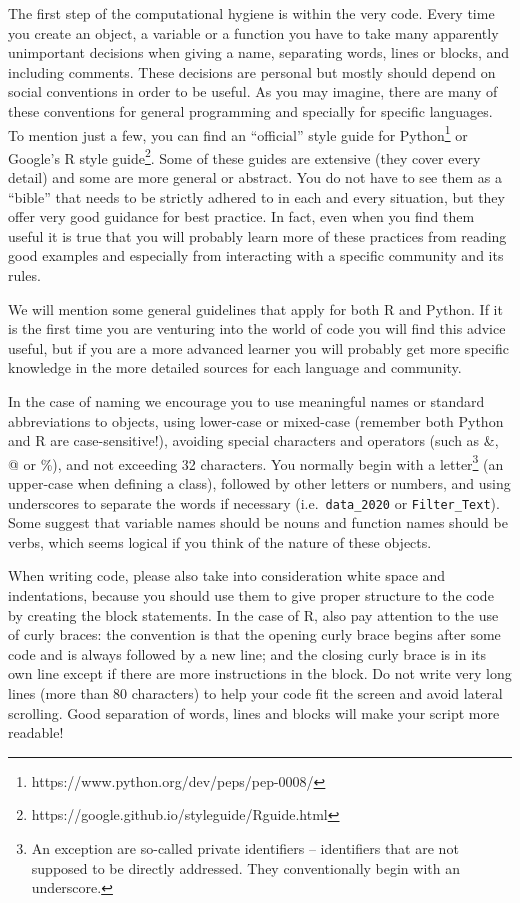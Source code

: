 The first step of the computational hygiene is within the very code. Every time you create an object, a variable or a function you have to take many apparently unimportant decisions when giving a name, separating words, lines or blocks, and including comments. These decisions are personal but mostly should depend on social conventions in order to be useful. As you may imagine, there are many of these conventions for general programming and specially for specific languages. To mention just a few, you can find an ``official'' style guide for Python\footnote{https://www.python.org/dev/peps/pep-0008/}  or Google's R style guide\footnote{https://google.github.io/styleguide/Rguide.html}. Some of these guides are extensive (they cover every detail) and some are more general or abstract. You do not have to see them as a ``bible'' that needs to be strictly adhered to in each and every situation, but they offer very good guidance for best practice. In fact, even when you find them useful it is true that you will probably learn more of these practices from reading good examples and especially from interacting with a specific community and its rules.

We will mention some general guidelines that apply for both R and Python. If it is the first time you are venturing into the world of code you will find this advice useful,  but if you are a more advanced learner you will probably get more specific knowledge in the more detailed sources for each language and community.

In the case of naming we encourage you to use meaningful names or standard abbreviations to objects, using lower-case or mixed-case (remember both Python and R are case-sensitive!), avoiding special characters and operators (such as \&, @ or \%), and not exceeding 32 characters. You normally begin with a letter\footnote{An exception are so-called private identifiers -- identifiers that are not supposed to be directly addressed. They conventionally begin with an underscore.} (an upper-case when defining a class), followed by other letters or numbers, and using underscores to separate the words if  necessary (i.e.\ \texttt{data\_2020} or \texttt{Filter\_Text}). Some suggest that variable names should be nouns and function names should be verbs, which seems logical if you think of the nature of these objects.

When writing code, please also take into consideration white space and indentations, because you should use them to give proper structure to the code by creating the block statements. In the case of R, also pay attention to the use of curly braces: the convention is that the opening curly brace begins after some code and is always followed by a new line; and the closing curly brace is in its own line except if there are more instructions in the block. Do not write very long lines (more than 80 characters) to help your code fit the screen and avoid lateral scrolling. Good separation of words, lines and blocks will make your script more readable!


